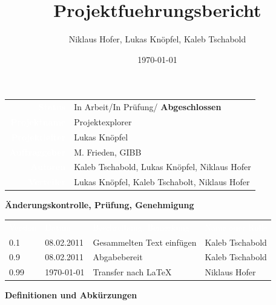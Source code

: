 \documentclass[10pt,paper=a4,final]{scrartcl}
\title{Projektfuehrungsbericht}
\author{Niklaus Hofer, Lukas Kn\"opfel, Kaleb Tschabold}
\date{\today}
\begin{document}
\maketitle
\newpage
\begin{tabularx}{\textwidth}{ r X }	%
  \textcolor{white}{{\bf Status}}\cellcolor{blue!80!} & In Arbeit/In Prüfung/ {\bf Abgeschlossen}\cellcolor{blue!20!} \\
\textcolor{white}{{\bf Projektname}}\cellcolor{blue!80!} & Projektexplorer\cellcolor{blue!20!} \\
\textcolor{white}{{\bf Projektleiter}}\cellcolor{blue!80!} & Lukas Kn\"opfel\cellcolor{blue!20!} \\
\textcolor{white}{{\bf Auftraggeber}}\cellcolor{blue!80!} & M. Frieden, GIBB\cellcolor{blue!20!} \\
\textcolor{white}{{\bf Autoren}}\cellcolor{blue!80!} & Kaleb Tschabold, Lukas Kn\"opfel, Niklaus Hofer\cellcolor{blue!20!} \\
\textcolor{white}{{\bf Verteiler}}\cellcolor{blue!80!} & Lukas Knöpfel, Kaleb Tschabolt, Niklaus Hofer\cellcolor{blue!20!}
\end{tabularx}
\newline
\newline
\newline
{\bf Änderungskontrolle, Prüfung, Genehmigung}
\newline

\begin{tabularx}{\textwidth}{l l X X}
\textcolor{white}{Version}\cellcolor{blue!80!} & \textcolor{white}{Datum}\cellcolor{blue!80!} & \textcolor{white}{Beschreibung, Bemerkung}\cellcolor{blue!80!} & \textcolor{white}{Name oder Rolle}\cellcolor{blue!80!} \\
\cellcolor{blue!20!} 0.1& \cellcolor{blue!20!} 08.02.2011 & Gesammelten Text einfügen \cellcolor{blue!20!} & Kaleb Tschabold \cellcolor{blue!20!} \\
\cellcolor{blue!20!} 0.9& \cellcolor{blue!20!} 08.02.2011 & Abgabebereit \cellcolor{blue!20!} & Kaleb Tschabold \cellcolor{blue!20!} \\
\cellcolor{blue!20!} 0.99& \cellcolor{blue!20!} \today{} & Transfer nach \LaTeX \cellcolor{blue!20!} & Niklaus Hofer \cellcolor{blue!20!} \\
\end{tabularx}
\newline
\newline
\newline
{\bf Definitionen und Abkürzungen}
\newline
\end{document}

